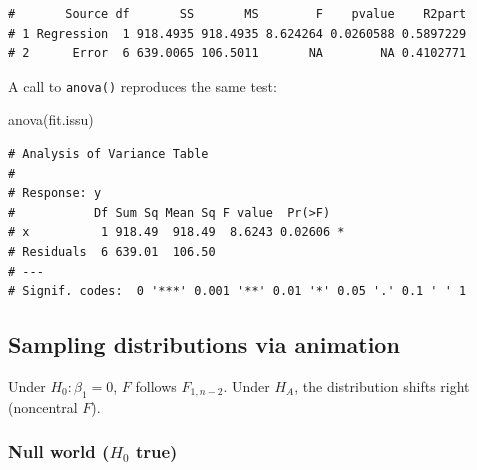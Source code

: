 \documentclass[
  letterpaper,
  DIV=11,
  numbers=noendperiod]{scrreprt}
\newenvironment{Shaded}{\begin{snugshade}}{\end{snugshade}}
\newcommand{\FunctionTok}[1]{\textcolor[rgb]{0.28,0.35,0.67}{#1}}
\newcommand{\NormalTok}[1]{\textcolor[rgb]{0.00,0.23,0.31}{#1}}
\begin{document}
\begin{verbatim}
#       Source df       SS       MS        F    pvalue    R2part
# 1 Regression  1 918.4935 918.4935 8.624264 0.0260588 0.5897229
# 2      Error  6 639.0065 106.5011       NA        NA 0.4102771
\end{verbatim}

A call to \texttt{anova()} reproduces the same test:

\begin{Shaded}
\begin{Highlighting}[]
\FunctionTok{anova}\NormalTok{(fit.issu)}
\end{Highlighting}
\end{Shaded}

\begin{verbatim}
# Analysis of Variance Table
# 
# Response: y
#           Df Sum Sq Mean Sq F value  Pr(>F)  
# x          1 918.49  918.49  8.6243 0.02606 *
# Residuals  6 639.01  106.50                  
# ---
# Signif. codes:  0 '***' 0.001 '**' 0.01 '*' 0.05 '.' 0.1 ' ' 1
\end{verbatim}

\subsection{Sampling distributions via
animation}\label{sampling-distributions-via-animation}

Under \(H_0:\beta_1=0\), \(F\) follows \(F_{1,n-2}\). Under \(H_A\), the
distribution shifts right (noncentral \(F\)).

\subsubsection{\texorpdfstring{Null world (\(H_0\)
true)}{Null world (H\_0 true)}}\label{null-world-h_0-true}
\end{document}
